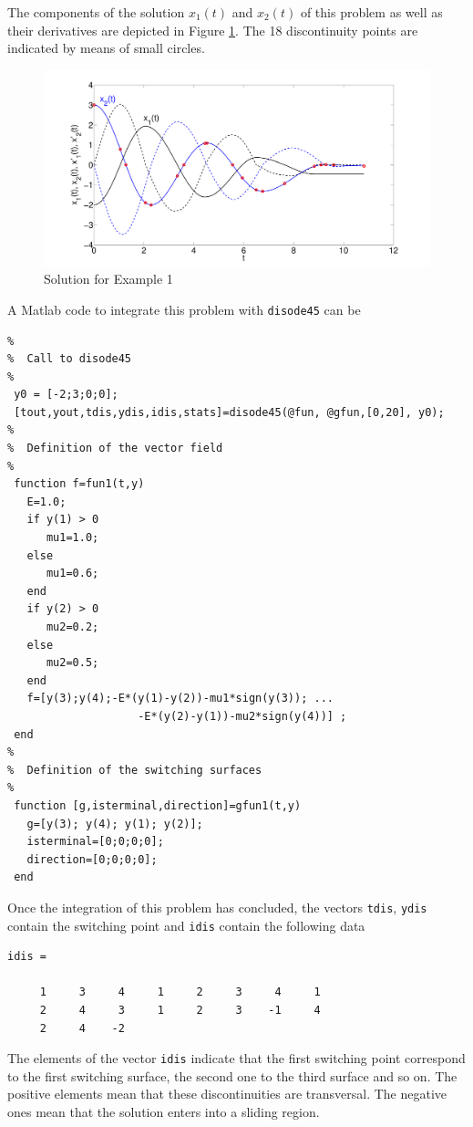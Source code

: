 \documentclass{article}
\begin{document}
\begin{description}
The components of the solution $x_1(t)$ and $x_2(t)$ of this problem as well as their derivatives are depicted in Figure \ref{Example1}.  The 18 discontinuity points are indicated by means of small circles.
\begin{figure}[!h]
\centerline{
\includegraphics[width=14 true cm]{Example1}
}
\caption{Solution for Example 1}
\label{Example1}
\end{figure}


A Matlab code to integrate this problem with \texttt{disode45} can be

\bigskip

\begin{verbatim}
%
%  Call to disode45
%
 y0 = [-2;3;0;0];
 [tout,yout,tdis,ydis,idis,stats]=disode45(@fun, @gfun,[0,20], y0);
%
%  Definition of the vector field
%
 function f=fun1(t,y)
   E=1.0;
   if y(1) > 0
      mu1=1.0;
   else
      mu1=0.6;
   end
   if y(2) > 0
      mu2=0.2;
   else
      mu2=0.5;
   end
   f=[y(3);y(4);-E*(y(1)-y(2))-mu1*sign(y(3)); ...
                    -E*(y(2)-y(1))-mu2*sign(y(4))] ;
 end
%
%  Definition of the switching surfaces
%
 function [g,isterminal,direction]=gfun1(t,y)
   g=[y(3); y(4); y(1); y(2)];
   isterminal=[0;0;0;0];
   direction=[0;0;0;0];
 end
\end{verbatim}

Once the integration of this problem has concluded, the vectors \texttt{tdis}, \texttt{ydis} contain the switching point
and \texttt{idis} contain the following data

\begin{verbatim}
idis =

     1     3     4     1     2     3     4     1
     2     4     3     1     2     3    -1     4
     2     4    -2
\end{verbatim}

The elements of the vector \texttt{idis} indicate that the first switching point correspond to the first switching surface, the second one to the third surface and so on.  The positive elements mean that these discontinuities are transversal.
The negative ones mean that the solution enters into a sliding region.


\end{description}
\end{document}

